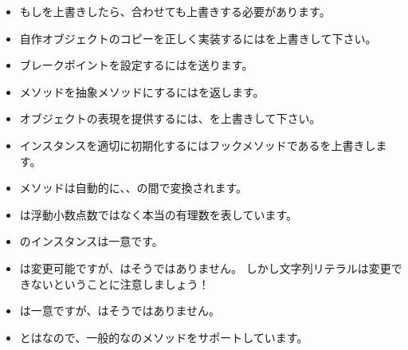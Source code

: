 \documentclass[a4paper,10pt,twoside]{book}
\begin{document}
\begin{itemize}

  \item もし\ct{=}を上書きしたら、合わせても上書きする必要があります。

  \item 自作オブジェクトのコピーを正しく実装するにはを上書きして下さい。

  \item ブレークポイントを設定するにはを送ります。

  \item メソッドを抽象メソッドにするにはを返します。

  \item オブジェクトの表現を提供するには、を上書きして下さい。

  \item インスタンスを適切に初期化するにはフックメソッドであるを上書きします。

  \item {}メソッドは自動的に、、の間で変換されます。

  \item {}は浮動小数点数ではなく本当の有理数を表しています。

  \item {}のインスタンスは一意です。

  \item {}は変更可能ですが、はそうではありません。
  しかし文字列リテラルは変更できないということに注意しましょう！

  \item {}は一意ですが、はそうではありません。

  \item {}とはなので、一般的なのメソッドをサポートしています。

\end{itemize}

\ifx\wholebook\relax\else
   
   
\end{document}
